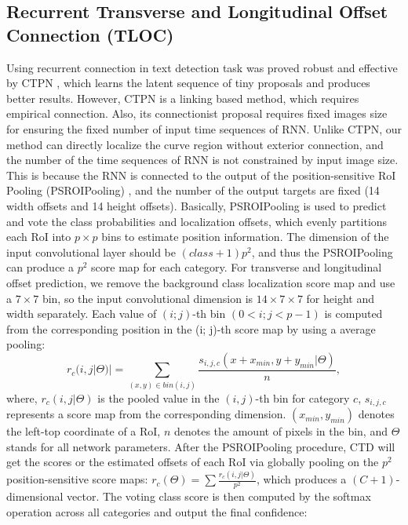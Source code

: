 \documentclass[10pt,twocolumn,letterpaper]{article}
\begin{document}
\subsection{Recurrent Transverse and Longitudinal Offset Connection (TLOC)}
Using recurrent connection in text detection task was proved robust and effective by CTPN \cite{tian2016detecting}, which learns the latent sequence of tiny proposals and produces better results. However, CTPN is a linking based method, which requires empirical connection. Also, its connectionist proposal requires fixed images size for ensuring the fixed number of input time sequences of RNN.
Unlike CTPN, our method can directly localize the curve region without exterior connection, and the number of the time sequences of RNN is not constrained by input image size. This is because the RNN is connected to the output of the position-sensitive RoI Pooling (PSROIPooling) \cite{dai2016r}, and the number of the output targets are fixed (14 width offsets and 14 height offsets).
Basically, PSROIPooling is used to predict and vote the class probabilities and localization offsets, which evenly partitions each RoI into $p\times p$ bins to estimate position information. The dimension of the input convolutional layer should be $(class+1)p^2$, and thus the PSROIPooling can produce a $p^2$ score map for each category. For transverse and longitudinal offset prediction, we remove the background class localization score map and use a $7\times 7$ bin, so the input convolutional dimension is $14\times 7\times 7$ for height and width separately. Each value of $(i; j)$-th bin $(0 < i; j < p-1)$ is computed from the corresponding position in the (i; j)-th score map by using a average pooling:
\begin{equation}\label{eq:psroi}
  r_{c}(i, j|\Theta)|= \sum\limits_{(x,y)\in bin(i,j)}\frac{s_{i,j,c}(x+x_{min}, y+y_{min}|\Theta)}{n},
\end{equation}
where, $r_c(i,j|\Theta)$ is the pooled value in the $(i,j)$-th bin for category $c$, $s_{i,j,c}$ represents a score map from the corresponding dimension. $(x_{min},y_{min})$ denotes the left-top coordinate of a RoI, $n$ denotes the amount of pixels in the bin, and $\Theta$ stands for all network parameters. After the PSROIPooling procedure, CTD will get the scores or the estimated offsets of each RoI via globally pooling on the $p^2$ position-sensitive score maps: $r_c(\Theta) = \sum\frac{r_c(i,j|\Theta)}{p^2}$, which produces a $(C + 1)$-dimensional vector.
The voting class score is then computed by the softmax operation across all categories and output the final confidence:
\end{document}
